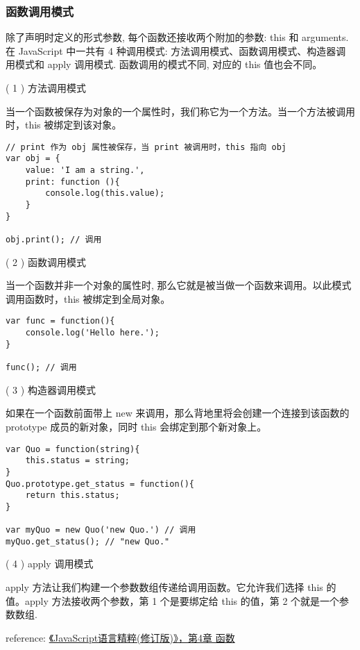 \subsubsection{函数调用模式}\hypertarget{section-4}{}\label{section-4}

除了声明时定义的形式参数, 每个函数还接收两个附加的参数: this 和 arguments. 在 JavaScript 中一共有 4 种调用模式: 方法调用模式、函数调用模式、构造器调用模式和 apply 调用模式. 函数调用的模式不同, 对应的 this 值也会不同。

( 1 ) 方法调用模式

当一个函数被保存为对象的一个属性时，我们称它为一个方法。当一个方法被调用时，this 被绑定到该对象。

\begin{verbatim}// print 作为 obj 属性被保存，当 print 被调用时，this 指向 obj
var obj = {
    value: 'I am a string.',
    print: function (){
        console.log(this.value);
    }
}

obj.print(); // 调用
\end{verbatim}

( 2 ) 函数调用模式

当一个函数并非一个对象的属性时, 那么它就是被当做一个函数来调用。以此模式调用函数时，this 被绑定到全局对象。

\begin{verbatim}var func = function(){
    console.log('Hello here.');
}

func(); // 调用
\end{verbatim}

( 3 ) 构造器调用模式

如果在一个函数前面带上 new 来调用，那么背地里将会创建一个连接到该函数的 prototype 成员的新对象，同时 this 会绑定到那个新对象上。

\begin{verbatim}var Quo = function(string){
    this.status = string;
}
Quo.prototype.get_status = function(){
    return this.status;
}

var myQuo = new Quo('new Quo.') // 调用
myQuo.get_status(); // "new Quo."
\end{verbatim}

( 4 ) apply 调用模式

apply 方法让我们构建一个参数数组传递给调用函数。它允许我们选择 this 的值。apply 方法接收两个参数，第 1 个是要绑定给 this 的值，第 2 个就是一个参数数组.

reference: \href{http://book.douban.com/subject/3590768/}{《JavaScript语言精粹(修订版)》，第4章 函数}

